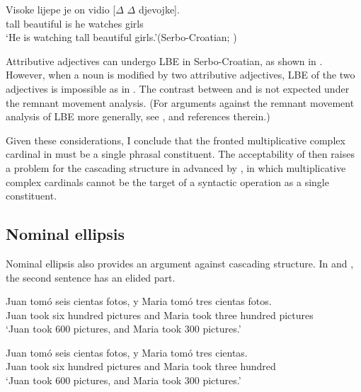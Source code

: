 \documentclass[output=paper]{langscibook}
\begin{document}
\ea\label{tat:mul.adj.lbe}
\gll \llap{$^*$}Visoke lijepe je on vidio [$\Delta$ $\Delta$ djevojke\textnormal{]}.\\  
      tall beautiful is he watches {} {} girls\\ 
\glt `He is watching tall beautiful girls.'\hfill (Serbo-Croatian; \citealt[2]{Boskovic2005})
\z

\noindent Attributive adjectives can undergo LBE in Serbo-Croatian, as shown in . However, when a noun is modified by two attributive adjectives, LBE of the two adjectives is impossible as in  \citep{Boskovic2005}. The contrast between  and  is not expected under the remnant movement analysis. (For arguments against the remnant movement analysis of LBE more generally, see \citealt{Boskovic2005,Stjepanovic2010, Stjepanovic2011,Despic2011,Talic2017}, and references therein.)

Given these considerations, I conclude that the fronted multiplicative complex cardinal in  must be a single phrasal constituent. The acceptability of  then raises a problem for the cascading structure in  advanced by \citet{IoninMatushansky2018}, in which multiplicative complex cardinals cannot be the target of a syntactic operation as a single constituent.

\subsection{Nominal ellipsis}\label{tat:sec:ne}
Nominal ellipsis also provides an argument against  cascading structure. In  and , the second sentence has an elided part.

\ea\label{tat:elip}
\ea\label{tat:elipa}
\gll Juan tomó seis cientas fotos, y Maria tomó tres cientas fotos.\\  
     Juan took six hundred pictures and Maria took three hundred pictures\\ 
\glt `Juan took 600 pictures, and Maria took 300 pictures.'

\ex\label{tat:elipb}
\gll Juan tomó seis cientas fotos, y Maria tomó tres cientas.\\  
    Juan took six hundred pictures and Maria took three hundred\\ 
\glt `Juan took 600 pictures, and Maria took 300 pictures.'
\end{document}
